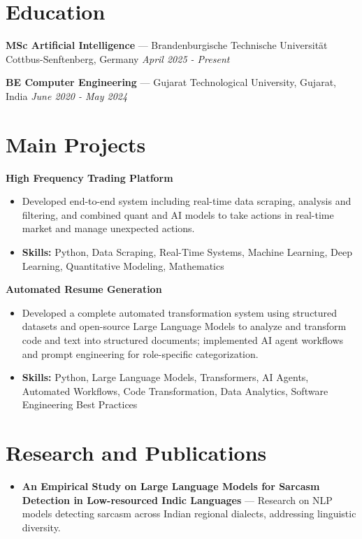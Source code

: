 \documentclass[a4paper,10pt]{article}
\begin{document}
\section*{Education}
\textbf{MSc Artificial Intelligence} — Brandenburgische Technische Universität Cottbus-Senftenberg, Germany \hfill \textit{April 2025 - Present}\par
\vspace{1.5pt}
\textbf{BE Computer Engineering} — Gujarat Technological University, Gujarat, India \hfill \textit{June 2020 - May 2024}\par

\section*{Main Projects}
\textbf{High Frequency Trading Platform}\par
\vspace{1pt}
\begin{itemize}
  \item Developed end-to-end system including real-time data scraping, analysis and filtering, and combined quant and AI models to take actions in real-time market and manage unexpected actions.
  \item \textbf{Skills:} Python, Data Scraping, Real-Time Systems, Machine Learning, Deep Learning, Quantitative Modeling, Mathematics
\end{itemize}
\vspace{3pt}
\textbf{Automated Resume Generation}\par
\vspace{1pt}
\begin{itemize}
  \item Developed a complete automated transformation system using structured datasets and open-source Large Language Models to analyze and transform code and text into structured documents; implemented AI agent workflows and prompt engineering for role-specific categorization.
  \item \textbf{Skills:} Python, Large Language Models, Transformers, AI Agents, Automated Workflows, Code Transformation, Data Analytics, Software Engineering Best Practices
\end{itemize}

\section*{Research and Publications}
\begin{itemize}
\item \textbf{An Empirical Study on Large Language Models for Sarcasm Detection in Low-resourced Indic Languages} — Research on NLP models detecting sarcasm across Indian regional dialects, addressing linguistic diversity.
\end{itemize}
\end{document}
